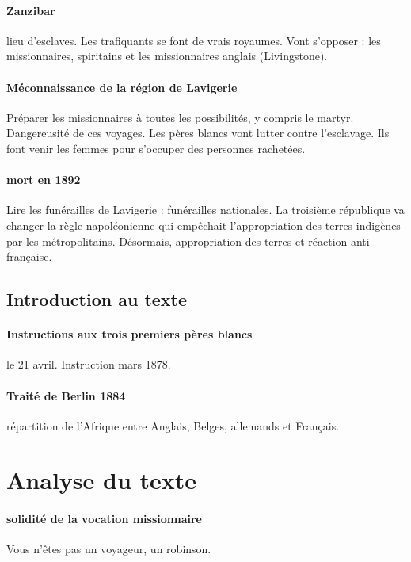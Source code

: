 \paragraph{Zanzibar} lieu d'esclaves. Les trafiquants se font de vrais royaumes. Vont s'opposer : les missionnaires, spiritains et les missionnaires anglais (Livingstone).

\paragraph{Méconnaissance de la région de Lavigerie} Préparer les missionnaires à toutes les possibilités, y compris le martyr. Dangereusité de ces voyages.
Les pères blancs vont lutter contre l'esclavage. Ils font venir les femmes pour s'occuper des personnes rachetées.

\paragraph{mort en 1892} Lire les funérailles de Lavigerie : funérailles nationales. La troisième république va changer la règle napoléonienne qui empêchait l'appropriation des terres indigènes par les métropolitains. Désormais, appropriation des terres et  réaction anti-française. 


\subsection{Introduction au texte}

\paragraph{Instructions aux trois premiers pères blancs} le 21 avril. Instruction mars 1878. 

\paragraph{Traité de Berlin 1884} répartition de l'Afrique entre Anglais, Belges, allemands et Français.

\section{Analyse du texte}

\paragraph{solidité de la vocation missionnaire} Vous n'êtes pas un voyageur, un robinson. 


